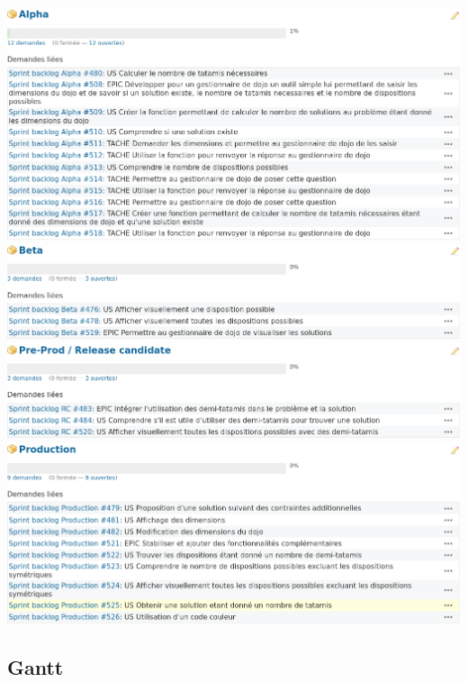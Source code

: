 \noindent%
\includegraphics[scale=0.5]{images/roadmap_alpha.png}\\
\includegraphics[scale=0.5]{images/roadmap_beta.png}\\
\includegraphics[scale=0.5]{images/roadmap_RC.png}\\
\includegraphics[scale=0.5]{images/roadmap_prod.png}

\subsection{Gantt}


